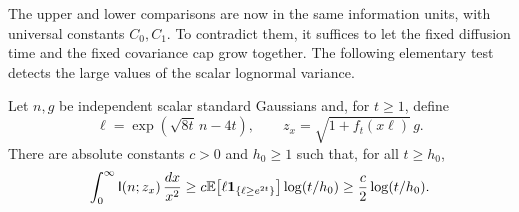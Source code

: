 The upper and lower comparisons are now in the same information
units, with universal constants $C_0,C_1$.  To contradict them, it
suffices to let the fixed diffusion time and the fixed covariance
cap grow together.  The following elementary test detects the
large values of the scalar lognormal variance.

\begin{lemma}
\label{lem:scalar-divergence}
Let $n,g$ be independent scalar standard Gaussians and, for
$t\ge1$, define
\[
 \ell=\exp(\sqrt{8t}\,n-4t),\qquad
 z_x=\sqrt{1+f_t(x\ell)}\,g.
\]
There are absolute constants $c>0$ and $h_0\ge1$ such that, for
all $t\ge h_0$,
\begin{equation}\label{eq:obs-scalar-divergence}
 \int_0^\infty\mathsf I(n;z_x)\,\frac{dx}{x^2}
 \ge c\mathbb E\big[\ell\mathbf 1_{\{\ell\ge e^{2t}\}}\big]
                  \log(t/h_0)
 \ge\frac c2\log(t/h_0).
\end{equation}
\end{lemma}

